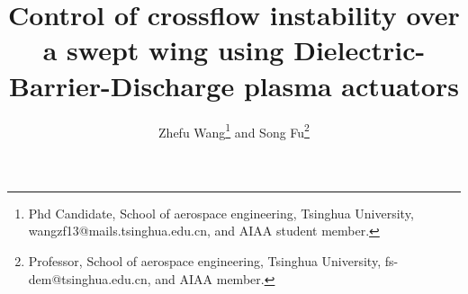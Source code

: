 \documentclass{AIAA}
\begin{document}
\title{Control of crossflow instability over a swept wing using Dielectric-Barrier-Discharge plasma actuators}

\author{Zhefu Wang\footnote{Phd Candidate, School of aerospace engineering, Tsinghua University, wangzf13@mails.tsinghua.edu.cn, and AIAA student member.} and Song Fu\footnote{Professor, School of aerospace engineering, Tsinghua University, fs-dem@tsinghua.edu.cn, and AIAA member.}}
\end{document}
